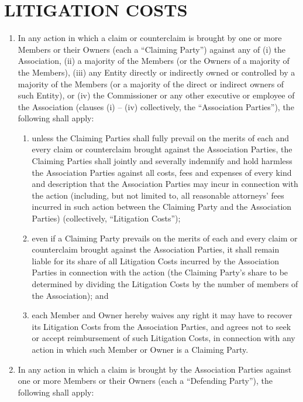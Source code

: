 \documentclass[]{book}
\providecommand{\tightlist}{%
  \setlength{\itemsep}{0pt}\setlength{\parskip}{0pt}}
\begin{document}
\hypertarget{litigation-costs}{%
\section{LITIGATION COSTS}\label{litigation-costs}}

\begin{enumerate}
\def\labelenumi{(\alph{enumi})}
\tightlist
\item
  In any action in which a claim or counterclaim is brought by one or more Members or their Owners (each a ``Claiming Party'') against any of (i) the Association, (ii) a majority of the Members (or the Owners of a majority of the Members), (iii) any Entity directly or indirectly owned or controlled by a majority of the Members (or a majority of the direct or indirect owners of such Entity), or (iv) the Commissioner or any other executive or employee of the Association (clauses (i) -- (iv) collectively, the ``Association Parties''), the following shall apply:

  \begin{enumerate}
  \def\labelenumii{(\roman{enumii})}
  \tightlist
  \item
    unless the Claiming Parties shall fully prevail on the merits of each and every claim or counterclaim brought against the Association Parties, the Claiming Parties shall jointly and severally indemnify and hold harmless the Association Parties against all costs, fees and expenses of every kind and description that the Association Parties may incur in connection with the action (including, but not limited to, all reasonable attorneys' fees incurred in such action between the Claiming Party and the Association Parties) (collectively, ``Litigation Costs'');
  \item
    even if a Claiming Party prevails on the merits of each and every claim or counterclaim brought against the Association Parties, it shall remain liable for its share of all Litigation Costs incurred by the Association Parties in connection with the action (the Claiming Party's share to be determined by dividing the Litigation Costs by the number of members of the Association); and
  \item
    each Member and Owner hereby waives any right it may have to recover its Litigation Costs from the Association Parties, and agrees not to seek or accept reimbursement of such Litigation Costs, in connection with any action in which such Member or Owner is a Claiming Party.
  \end{enumerate}
\item
  In any action in which a claim is brought by the Association Parties against one or more Members or their Owners (each a ``Defending Party''), the following shall apply:


\end{enumerate}
\end{document}
